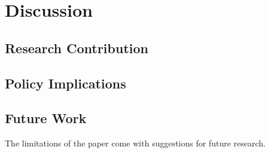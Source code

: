 \section{Discussion}
\subsection{Research Contribution}
\subsection{Policy Implications}
\subsection{Future Work}
The limitations of the paper come with suggestions for future research. 








